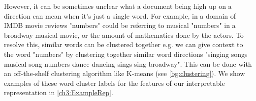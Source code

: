  However, it can be sometimes unclear what a document being high up on a direction can mean when it's just a single word. For example, in a domain of IMDB movie reviews "numbers" could be referring to musical "numbers" in a broadway musical movie, or the amount of mathematics done by the actors. To resolve this, similar words can be clustered together e.g.  we can give context to the word "numbers" by clustering together similar word directions  "singing songs musical song numbers dance dancing sings sing broadway". This can be done with an off-the-shelf clustering algorithm like K-means (see \ref{bg:clustering}). We show examples of these word cluster labels for the features of our interpretable representation in \ref{ch3:ExampleRep}.








 
